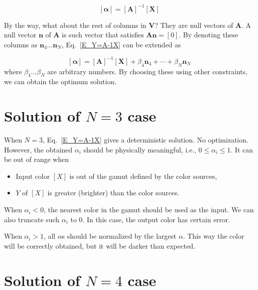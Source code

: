 \documentclass[dvipdfmx,a4paper]{article}
\begin{document}
\begin{equation}
  \label{E_Y=A-1X}
  \left[ \boldsymbol{\alpha} \right] =
  \left[ \boldsymbol{A} \right]^{-1}
  \left[ \boldsymbol{X} \right]
\end{equation}

By the way, what about the rest of columns in $ \boldsymbol{V} $? They are null vectors of $ \boldsymbol{A} $. A null vector $\boldsymbol{n}$ of $ \boldsymbol{A}$ is such vector that satisfies $ \boldsymbol{A} \boldsymbol{n} = [0]$. By denoting these columns as $ \boldsymbol{n}_4 \ldots \boldsymbol{n}_N $, Eq.~\eqref{E_Y=A-1X} can be extended as

\begin{equation}
  \label{E_Y=A-1X+n}
  \left[ \boldsymbol{\alpha} \right] =
  \left[ \boldsymbol{A} \right]^{-1}
  \left[ \boldsymbol{X} \right]
  + \beta_4 \boldsymbol{n}_4 + \cdots + \beta_N \boldsymbol{n}_N
\end{equation}
\noindent
where $ \beta_4 \ldots \beta_N $ are arbitrary numbers. By choosing these using other constraints, we can obtain the optimum solution.





\section{Solution of $N=3$ case}

When $N=3$, Eq.~\eqref{E_Y=A-1X} gives a deterministic solution. No optimization. However, the obtained $ \alpha_i $ should be physically meaningful, i.e., $ 0 \leq \alpha_i \leq 1 $. It can be out of range when
\begin{itemize}
  \item Input color $[X]$ is out of the gamut defined by the color sources,
  \item $Y$ of $[X]$ is greater (brighter) than the color sources.
\end{itemize}
\noindent
When $ \alpha_i < 0$, the nearest color in the gamut should be used as the input. We can also truncate such $\alpha_i$ to 0. In this case, the output color has certain error.

When $ \alpha_i > 1 $, all $\alpha$s should be normalized by the largest $\alpha$. This way the color will be correctly obtained, but it will be darker than expected.




\section{Solution of $N=4$ case}
\end{document}
